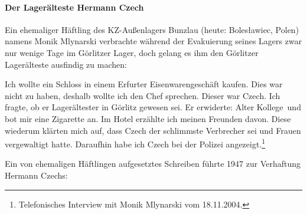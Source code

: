 \documentclass[a4paper,12pt,ngerman,
]{nisebook}
\begin{document}
\paragraph{Der Lagerälteste Hermann Czech\label{czech_ahndung}} 
Ein ehemaliger Häftling des KZ-Außenlagers Bunzlau (heute: Boles\l awiec, Polen) namens Monik Mlynarski verbrachte während der Evakuierung seines Lagers zwar nur wenige Tage im Görlitzer Lager, doch gelang es ihm den Görlitzer Lagerälteste ausfindig zu machen:
\begin{leftbar} 
Ich wollte ein Schloss in einem Erfurter Eisenwarengeschäft kaufen. Dies war nicht zu haben, deshalb wollte ich den Chef sprechen. Dieser war Czech. Ich fragte, ob er Lagerältester in Görlitz gewesen sei. Er erwiderte: \glqq Alter Kollege\grqq~und bot mir eine Zigarette an. Im Hotel erzählte ich meinen Freunden davon. Diese wiederum klärten mich auf, dass Czech der schlimmste Verbrecher sei und Frauen vergewaltigt hatte. Daraufhin habe ich Czech bei der Polizei angezeigt.\footnote{Telefonisches Interview mit Monik Mlynarski vom 18.11.2004.}
\end{leftbar}

Ein von ehemaligen Häftlingen aufgesetztes Schreiben führte 1947 zur Verhaftung Hermann Czechs:
\end{document}
